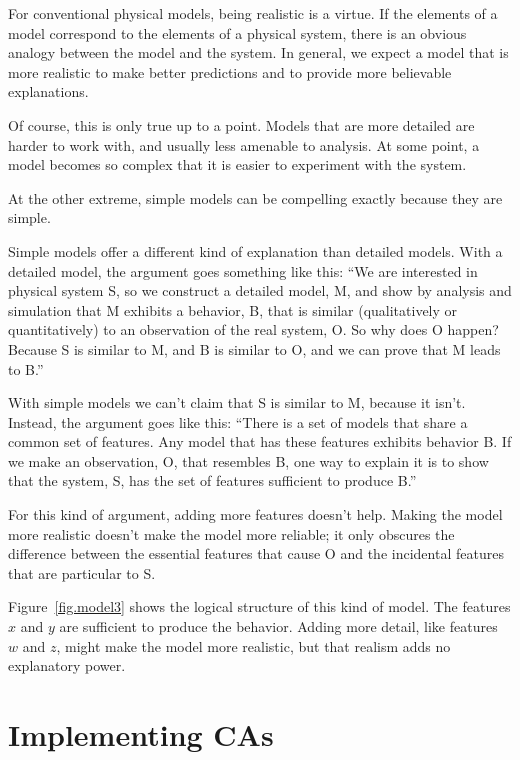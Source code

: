 \documentclass[12pt]{book}
\theoremstyle{exercise}
\begin{document}

For conventional physical models, being realistic is a virtue.  If the elements of a model correspond to the elements of a physical system, there is an obvious analogy between the
model and the system.  In general, we expect a model that is more
realistic to make better predictions and to provide more believable
explanations.


Of course, this is only true up to a point.  Models that are
more detailed are harder to work with, and usually less
amenable to analysis.  At some point, a model becomes so complex
that it is easier to experiment with the system.

At the other extreme, simple models can be compelling exactly because
they are simple.

Simple models offer a different kind of explanation than detailed
models.  With a detailed model, the argument goes something
like this: ``We are interested in physical system S, so we
construct a detailed model, M, and show by analysis and simulation
that M exhibits a behavior, B, that is similar (qualitatively
or quantitatively) to an observation of the real system, O.
So why does O happen?  Because S is similar to M, and
B is similar to O, and we can prove that M leads to B.''

With simple models we can't claim that S is similar to M, because it
isn't.  Instead, the argument goes like this: ``There is a set of models
that share a common set of features.  Any model that has these
features exhibits behavior B.  If we make an observation, O, that
resembles B, one way to explain it is to show that the system, S, has
the set of features sufficient to produce B.''

For this kind of argument, adding more features doesn't help.  Making
the model more realistic doesn't make the model more reliable; it only
obscures the difference between the essential features that cause O
and the incidental features that are particular to S.

Figure~\ref{fig.model3} shows the logical structure of this kind of
model.  The features $x$ and $y$ are sufficient to produce the
behavior.  Adding more detail, like features $w$ and $z$, might make
the model more realistic, but that realism adds no explanatory power.


\section{Implementing CAs}
\end{document}
